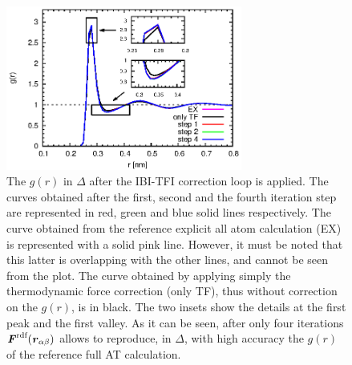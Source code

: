 \documentclass[aps,pre,preprint]{revtex4}
\renewcommand{\v}[1]{\textbf{\textit{#1}}}
\begin{document}
\begin{figure}
  \centering
  \includegraphics[width=0.69\textwidth]{rdf.eps}
  \caption{The $g(r)$ in $\Delta$ after the IBI-TFI correction loop is applied.  The
    curves obtained after the first, second and the fourth iteration step are represented in red, green and blue solid lines respectively.  The
    curve obtained from the reference explicit all atom calculation (EX) is represented with a solid pink line. However, it must be noted that this latter 
is overlapping with the other lines, and cannot be seen from the
    plot. The curve obtained by applying simply the thermodynamic force correction (only TF),  thus without
    correction on the $g(r)$, is in black. The two insets
    show the details at the
    first peak and the first valley. As it can be seen, after only four iterations $\v F^{\textrm{rdf}}(\v r_{\alpha\beta})$ allows to reproduce, in $\Delta$, with high accuracy the $g(r)$ of the reference full AT calculation.}
  \label{fig:tmp4}
\end{figure} 
\end{document}
